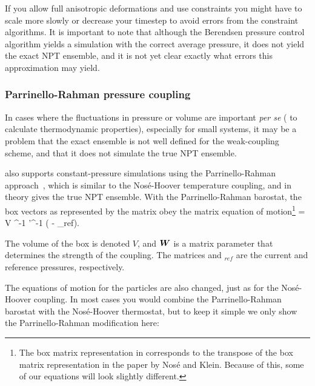 If you allow full anisotropic deformations and use constraints you
might have to scale more slowly or decrease your timestep to avoid
errors from the constraint algorithms.  It is important to note that
although the Berendsen pressure control algorithm yields a simulation
with the correct average pressure, it does not yield the exact NPT
ensemble, and it is not yet clear exactly what errors this approximation
may yield.

\subsubsection{Parrinello-Rahman pressure coupling}

In cases where the fluctuations in pressure or volume are important
{\em per se} ({\eg} to calculate thermodynamic properties), especially
for small systems, it may be a problem that the exact ensemble is not
well defined for the weak-coupling scheme, and that it does not
simulate the true NPT ensemble.

{\gromacs} also supports constant-pressure simulations using the
Parrinello-Rahman approach~\cite{Parrinello81,Nose83}, which is similar
to the Nos{\'e}-Hoover temperature coupling, and in theory gives the
true NPT ensemble.  With the Parrinello-Rahman barostat, the box
vectors as represented by the matrix  obey the matrix equation
of motion\footnote{The box matrix representation  in {\gromacs}
corresponds to the transpose of the box matrix representation 
in the paper by Nos{\'e} and Klein. Because of this, some of our
equations will look slightly different.}
\beq
{}= V ^{-1} '^{-1} \left(  - _{ref}\right).
\eeq

The volume of the box is denoted $V$, and $\mbox{\boldmath ${W}$}$ is a matrix parameter that determines
the strength of the coupling. The matrices  and $_{ref}$ are the 
current and reference pressures, respectively.

The equations of motion for the particles are also changed, just as
for the Nos{\'e}-Hoover coupling. In most cases you would combine the 
Parrinello-Rahman barostat with the Nos{\'e}-Hoover
thermostat, but to keep it simple we only show the Parrinello-Rahman 
modification here:

